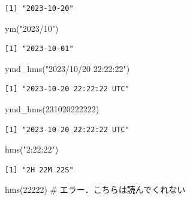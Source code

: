 \documentclass[
  letterpaper,
  DIV=11,
  numbers=noendperiod]{scrreprt}
\newenvironment{Shaded}{\begin{snugshade}}{\end{snugshade}}
\newcommand{\CommentTok}[1]{\textcolor[rgb]{0.37,0.37,0.37}{#1}}
\newcommand{\DecValTok}[1]{\textcolor[rgb]{0.68,0.00,0.00}{#1}}
\newcommand{\FunctionTok}[1]{\textcolor[rgb]{0.28,0.35,0.67}{#1}}
\newcommand{\NormalTok}[1]{\textcolor[rgb]{0.00,0.23,0.31}{#1}}
\newcommand{\StringTok}[1]{\textcolor[rgb]{0.13,0.47,0.30}{#1}}
\begin{document}
\begin{verbatim}
[1] "2023-10-20"
\end{verbatim}

\begin{Shaded}
\begin{Highlighting}[]
\FunctionTok{ym}\NormalTok{(}\StringTok{"2023/10"}\NormalTok{)}
\end{Highlighting}
\end{Shaded}

\begin{verbatim}
[1] "2023-10-01"
\end{verbatim}

\begin{Shaded}
\begin{Highlighting}[]
\FunctionTok{ymd\_hms}\NormalTok{(}\StringTok{"2023/10/20 22:22:22"}\NormalTok{)}
\end{Highlighting}
\end{Shaded}

\begin{verbatim}
[1] "2023-10-20 22:22:22 UTC"
\end{verbatim}

\begin{Shaded}
\begin{Highlighting}[]
\FunctionTok{ymd\_hms}\NormalTok{(}\DecValTok{231020222222}\NormalTok{)}
\end{Highlighting}
\end{Shaded}

\begin{verbatim}
[1] "2023-10-20 22:22:22 UTC"
\end{verbatim}

\begin{Shaded}
\begin{Highlighting}[]
\FunctionTok{hms}\NormalTok{(}\StringTok{"2:22:22"}\NormalTok{)}
\end{Highlighting}
\end{Shaded}

\begin{verbatim}
[1] "2H 22M 22S"
\end{verbatim}

\begin{Shaded}
\begin{Highlighting}[]
\FunctionTok{hms}\NormalTok{(}\DecValTok{22222}\NormalTok{) }\CommentTok{\# エラー．こちらは読んでくれない}
\end{Highlighting}
\end{Shaded}
\end{document}
